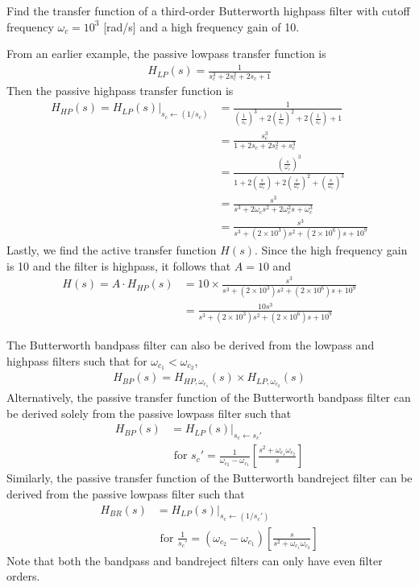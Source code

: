 \documentclass{report}
\begin{document}
\begin{example}
    Find the transfer function of a third-order Butterworth highpass filter with cutoff frequency $\omega_c = 10^3$ [rad/s] and a high frequency gain of 10.
\end{example}
\begin{solution}
    From an earlier example, the passive lowpass transfer function is 
    \begin{align*}
        H_{LP}(s) = \frac{1}{s_c^3+2s_c^2+2s_c+1}
    \end{align*}
    Then the passive highpass transfer function is 
    \begin{align*}
        H_{HP}(s) = H_{LP}(s)\bigg|_{s_c\leftarrow (1/s_c)} &= \frac{1}{\left(\frac{1}{s_c}\right)^3+2\left(\frac{1}{s_c}\right)^2+2\left(\frac{1}{s_c}\right)+1} \\
        &= \frac{s_c^3}{1 + 2s_c + 2s_c^2 + s_c^3} \\ 
        &= \frac{\left(\frac{s}{\omega_c}\right)^3}{1 + 2\left(\frac{s}{\omega_c}\right) + 2\left(\frac{s}{\omega_c}\right)^2 + \left(\frac{s}{\omega_c}\right)^3} \\
        &= \frac{s^3}{s^3 + 2\omega_c s^2 + 2\omega_c^2 s + \omega_c^3} \\ 
        &= \frac{s^3}{s^3+(2\times 10^3)s^2+(2\times 10^6)s+10^9}
    \end{align*}
    Lastly, we find the active transfer function $H(s)$. Since the high frequency gain is 10 and the filter is highpass, it follows that $A=10$ and 
    \begin{align*}
        H(s) = A\cdot H_{HP}(s) &= 10 \times \frac{s^3}{s^3+(2\times 10^3)s^2+(2\times 10^6)s+10^9} \\
        &= \frac{10s^3}{s^3+(2\times 10^3)s^2+(2\times 10^6)s+10^9}
    \end{align*}
\end{solution}

\noindent The Butterworth bandpass filter can also be derived from the lowpass and highpass filters such that for $\omega_{c_1} < \omega_{c_2}$,
\begin{align}
    H_{BP}(s) = H_{HP,\omega_{c_1}}(s)\times H_{LP,\omega_{c_2}}(s)
\end{align} 
Alternatively, the passive transfer function of the Butterworth bandpass filter can be derived solely from the passive lowpass filter such that
\begin{align}
    H_{BP}(s) &= H_{LP}(s)\bigg|_{s_c\leftarrow s_c'} \\
    &\text{ for } s_c' = \frac{1}{\omega_{c_2}-\omega_{c_1}}\left[\frac{s^2+\omega_{c_1}\omega_{c_2}}{s}\right]
\end{align}
Similarly, the passive transfer function of the Butterworth bandreject filter can be derived from the passive lowpass filter such that 
\begin{align}
    H_{BR}(s) &= H_{LP}(s)\bigg|_{s_c\leftarrow (1/s_c')} \\
    &\text{ for } \frac{1}{s_c'} = (\omega_{c_2}-\omega_{c_1})\left[\frac{s}{s^2+\omega_{c_1}\omega_{c_2}}\right]
\end{align}
Note that both the bandpass and bandreject filters can only have even filter orders.
\end{document}
